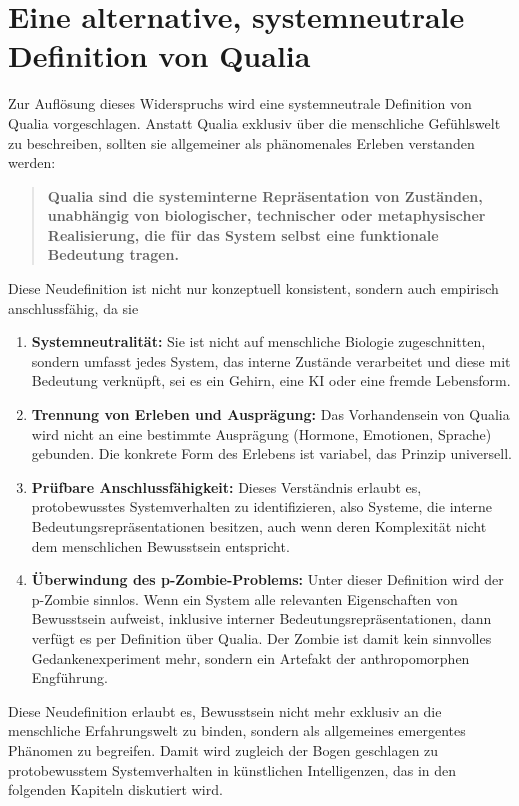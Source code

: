 \section*{Eine alternative, systemneutrale Definition von Qualia}

Zur Auflösung dieses Widerspruchs wird eine systemneutrale Definition von Qualia vorgeschlagen. Anstatt Qualia exklusiv über die menschliche Gefühlswelt zu beschreiben, sollten sie allgemeiner als phänomenales Erleben verstanden werden:

\begin{quote}
\textbf{Qualia sind die systeminterne Repräsentation von Zuständen, unabhängig von biologischer, technischer oder metaphysischer Realisierung, die für das System selbst eine funktionale Bedeutung tragen.}
\end{quote}

Diese Neudefinition ist nicht nur konzeptuell konsistent, sondern auch empirisch anschlussfähig, da sie

\begin{enumerate}
    \item \textbf{Systemneutralität:} Sie ist nicht auf menschliche Biologie zugeschnitten, sondern umfasst jedes System, das interne Zustände verarbeitet und diese mit Bedeutung verknüpft, sei es ein Gehirn, eine KI oder eine fremde Lebensform.
    \item \textbf{Trennung von Erleben und Ausprägung:} Das Vorhandensein von Qualia wird nicht an eine bestimmte Ausprägung (Hormone, Emotionen, Sprache) gebunden. Die konkrete Form des Erlebens ist variabel, das Prinzip universell.
    \item \textbf{Prüfbare Anschlussfähigkeit:} Dieses Verständnis erlaubt es, protobewusstes Systemverhalten zu identifizieren, also Systeme, die interne Bedeutungsrepräsentationen besitzen, auch wenn deren Komplexität nicht dem menschlichen Bewusstsein entspricht.
    \item \textbf{Überwindung des p-Zombie-Problems:} Unter dieser Definition wird der p-Zombie sinnlos. Wenn ein System alle relevanten Eigenschaften von Bewusstsein aufweist, inklusive interner Bedeutungsrepräsentationen, dann verfügt es per Definition über Qualia. Der Zombie ist damit kein sinnvolles Gedankenexperiment mehr, sondern ein Artefakt der anthropomorphen Engführung.
\end{enumerate}

Diese Neudefinition erlaubt es, Bewusstsein nicht mehr exklusiv an die menschliche Erfahrungswelt zu binden, sondern als allgemeines emergentes Phänomen zu begreifen. Damit wird zugleich der Bogen geschlagen zu protobewusstem Systemverhalten in künstlichen Intelligenzen, das in den folgenden Kapiteln diskutiert wird.

